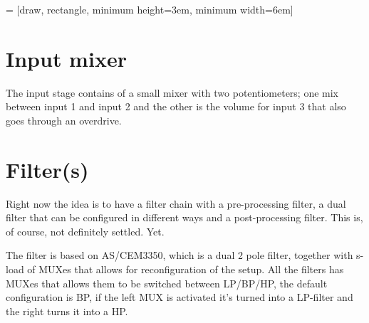 \documentclass[12pt]{article}
\begin{document}
 = [draw, rectangle, minimum height=3em, minimum width=6em]

\section*{Input mixer}

The input stage contains of a small mixer with two potentiometers;
one mix between input 1 and input 2 and the other is the volume for
input 3 that also goes through an overdrive.

\bigskip


\pagebreak

\section*{Filter(s)}

Right now the idea is to have a filter chain with a pre-processing filter,
a dual filter that can be configured in different ways and a post-processing
filter. This is, of course, not definitely settled. Yet.

\bigskip


\bigskip

The filter is based on AS/CEM3350, which is a dual 2 pole filter, together with
s-load of MUXes that allows for reconfiguration of the setup. All the filters
has MUXes that allows them to be switched between LP/BP/HP, the default configuration
is BP, if the left MUX is activated it's turned into a LP-filter and the right turns
it into a HP.
\end{document}
